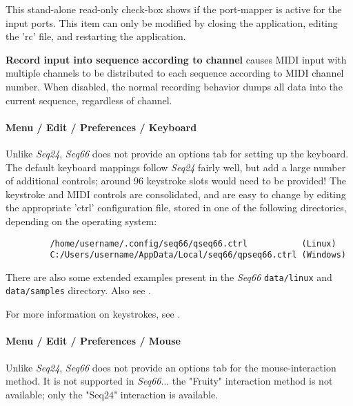    This stand-alone
   read-only check-box shows if the port-mapper is active for the input
   ports.  This item can only be modified by closing the application, editing
   the 'rc' file, and restarting the application.

   \textbf{Record input into sequence according to channel}
   causes MIDI input with multiple channels to be distributed to
   each sequence according to MIDI channel number.
   When disabled, the normal recording behavior dumps all data into the current
   sequence, regardless of channel.

\paragraph{Menu / Edit / Preferences / Keyboard}
\label{paragraph:menu_edit_preferences_keyboard}

   Unlike \textsl{Seq24}, \textsl{Seq66} does not provide an options tab for
   setting up the keyboard.
   The default keyboard mappings follow \textsl{Seq24} fairly well,
   but add a large number of additional controls;
   around 96 keystroke slots would need to be provided!
   The keystroke and MIDI controls are consolidated, and are easy to change by
   editing the appropriate 'ctrl' configuration file, stored in one of the
   following directories, depending on
   the operating system:
   
   \begin{verbatim}
         /home/username/.config/seq66/qseq66.ctrl           (Linux)
         C:/Users/username/AppData/Local/seq66/qpseq66.ctrl (Windows)
   \end{verbatim}

   There are also some extended examples present in the \textsl{Seq66}
   \texttt{data/linux} and
   \texttt{data/samples} directory.
   Also see .

   For more information on keystrokes, see
   .

\paragraph{Menu / Edit / Preferences / Mouse}
\label{paragraph:menu_edit_preferences_mouse}

   Unlike \textsl{Seq24}, \textsl{Seq66} does not provide an options tab for
   the mouse-interaction method.
   It is not supported in \textsl{Seq66}...
   the "Fruity" interaction method is not available;
   only the "Seq24" interaction is available.
 
